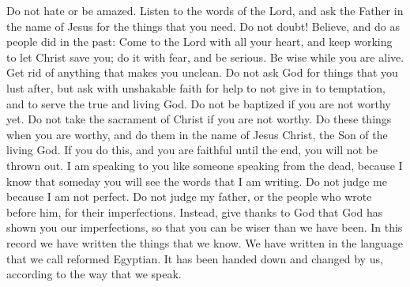 Do not hate or be amazed. Listen to the words of the Lord, and ask the Father in the name of Jesus for the things that you need. Do not doubt! Believe, and do as people did in the past: Come to the Lord with all your heart, and keep working to let Christ save you; do it with fear, and be serious.
\bverse \iffalse Be wise in the days of your probation; strip yourselves of all uncleanness; ask not, that ye may consume it on your lusts, but ask with a firmness unshaken, that ye will yield to no temptation, but that ye will serve the true and living God. \fi
Be wise while you are alive. Get rid of anything that makes you unclean. Do not ask God for things that you lust after, but ask with unshakable faith for help to not give in to temptation, and to serve the true and living God.
\bverse \iffalse See that ye are not baptized unworthily; see that ye partake not of the sacrament of Christ unworthily; but see that ye do all things in worthiness, and do it in the name of Jesus Christ, the Son of the living God; and if ye do this, and endure to the end, ye will in nowise be cast out. \fi
Do not be baptized if you are not worthy yet. Do not take the sacrament of Christ if you are not worthy. Do these things when you are worthy, and do them in the name of Jesus Christ, the Son of the living God. If you do this, and you are faithful until the end, you will not be thrown out.
\bverse \iffalse Behold, I speak unto you as though I spake from the dead; for I know that ye shall have my words. \fi
I am speaking to you like someone speaking from the dead, because I know that someday you will see the words that I am writing.
\bverse \iffalse Condemn me not because of mine imperfection, neither my father, because of his imperfection, neither them who have written before him; but rather give thanks unto God that he hath made manifest unto you our imperfections, that ye may learn to be more wise than we have been. \fi
Do not judge me because I am not perfect. Do not judge my father, or the people who wrote before him, for their imperfections. Instead, give thanks to God that God has shown you our imperfections, so that you can be wiser than we have been.
\bverse \iffalse And now, behold, we have written this record according to our knowledge, in the characters which are called among us the reformed Egyptian, being handed down and altered by us, according to our manner of speech. \fi
In this record we have written the things that we know. We have written in the language that we call reformed Egyptian. It has been handed down and changed by us, according to the way that we speak.
